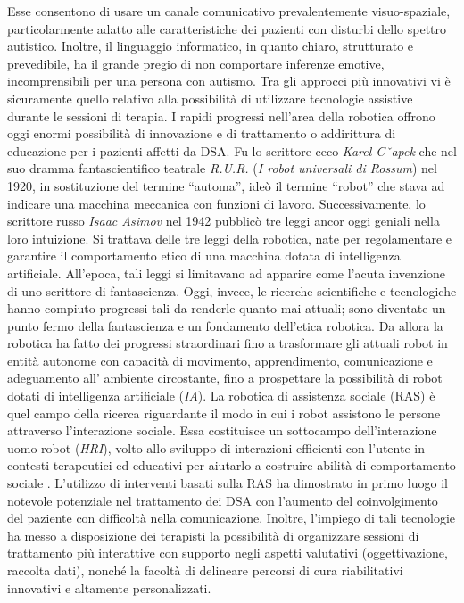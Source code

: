 \begin{sloppypar}
{Esse consentono di usare un canale comunicativo prevalentemente visuo-spaziale, particolarmente adatto alle caratteristiche dei pazienti con disturbi dello spettro autistico. Inoltre, il linguaggio informatico, in quanto chiaro, strutturato e prevedibile, ha il grande pregio di non comportare inferenze emotive, incomprensibili per una persona con autismo.
Tra gli approcci più  innovativi vi è sicuramente quello relativo
alla possibilità  di utilizzare tecnologie assistive durante le sessioni di terapia. 
I rapidi progressi nell’area della robotica offrono oggi enormi possibilità di innovazione e di trattamento o addirittura di educazione per i pazienti affetti da DSA.
Fu lo scrittore ceco \textit{Karel Cˇapek}  che nel suo dramma fantascientifico 
teatrale \textit{R.U.R.} (\textit{I robot universali di Rossum}) nel 1920,  in  sostituzione  del  termine  “automa”,  ideò  il  termine “robot” che stava ad indicare una macchina meccanica con funzioni di lavoro. 
Successivamente, lo scrittore russo \textit{Isaac Asimov}  nel  1942  pubblicò   tre  leggi  ancor  oggi  geniali  nella loro intuizione. Si trattava delle tre leggi della robotica, nate per regolamentare e garantire il comportamento etico di una macchina dotata di intelligenza artificiale.\newline
All'epoca, tali leggi si limitavano ad apparire come l’acuta invenzione di uno scrittore di fantascienza. Oggi, invece, le ricerche scientifiche e tecnologiche hanno compiuto progressi tali da renderle quanto mai attuali; sono diventate un punto fermo della fantascienza e un fondamento dell’etica robotica.\newline
Da allora la robotica ha fatto dei progressi straordinari fino a  trasformare  gli  attuali  robot  in  entità autonome con capacità di movimento, apprendimento, comunicazione e adeguamento  all’ ambiente circostante,  fino  a  prospettare  la  possibilità  di  robot dotati di intelligenza artificiale (\textit{IA}).\newline
  La  robotica  di  assistenza  sociale (RAS) è quel campo della ricerca riguardante il modo in cui i robot assistono le persone attraverso l’interazione sociale. Essa costituisce un sottocampo dell’interazione uomo-robot (\textit{HRI}), volto allo sviluppo di interazioni efficienti con l’utente in contesti terapeutici  ed  educativi  per  aiutarlo  a  costruire  abilità  di  comportamento sociale \cite{Numero7}.\newline
L’utilizzo di interventi basati sulla RAS ha dimostrato in primo luogo il notevole potenziale nel trattamento dei DSA con l'aumento del coinvolgimento del paziente con difficoltà nella comunicazione. Inoltre, l'impiego di tali tecnologie ha messo a disposizione dei terapisti la possibilità di organizzare sessioni di trattamento più interattive \cite{Numero9}\cite{Numero10} con supporto negli aspetti valutativi (oggettivazione, raccolta dati), nonché la facoltà di delineare percorsi di cura riabilitativi innovativi e altamente personalizzati.
}
\end{sloppypar}
